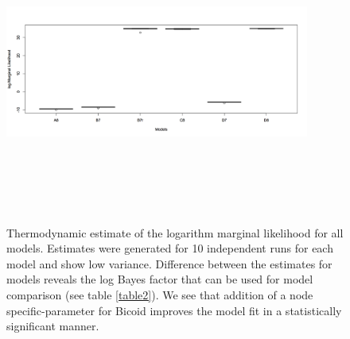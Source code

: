 \begin{figure}
\centering
\includegraphics[height = 10cm, width = 10cm]{tex/embryo/figure-4.png}
\caption{Thermodynamic estimate of the logarithm marginal likelihood for all models. Estimates were generated for 10 independent runs for each model and show low variance. Difference between the estimates for models reveals the log Bayes factor that can be used for model comparison (see table \ref{table2}). We see that addition of a node specific-parameter for Bicoid improves the model fit in a statistically significant manner.}
\label{fig:logML}
\end{figure}


